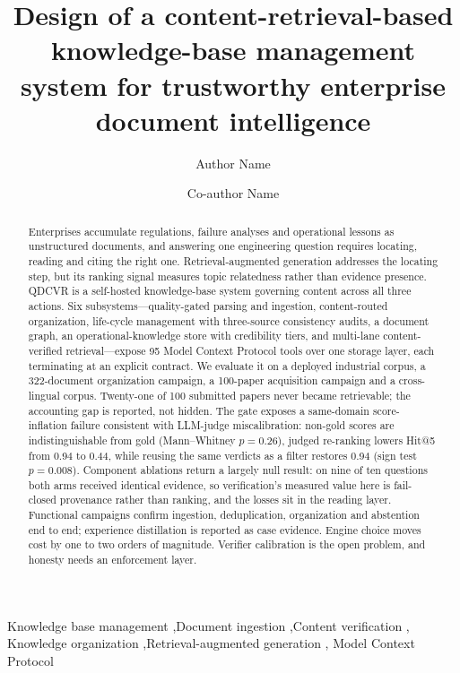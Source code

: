 \documentclass[preprint,12pt]{elsarticle}
\begin{document}
\begin{frontmatter}

\title{Design of a content-retrieval-based knowledge-base management system
for trustworthy enterprise document intelligence}

\author[inst1]{Author Name}
\author[inst1]{Co-author Name}

\begin{abstract}
Enterprises accumulate regulations, failure analyses and operational lessons
as unstructured documents, and answering one engineering question requires
locating, reading and citing the right one. Retrieval-augmented generation
addresses the locating step, but its ranking signal measures topic relatedness
rather than evidence presence. QDCVR is a self-hosted
knowledge-base system governing content across all three
actions. Six subsystems---quality-gated parsing and ingestion, content-routed
organization, life-cycle management with three-source consistency audits, a
document graph, an operational-knowledge store with credibility tiers, and
multi-lane content-verified retrieval---expose 95 Model Context Protocol tools
over one storage layer, each terminating at an explicit contract. We evaluate it on a deployed industrial corpus, a
322-document organization campaign, a 100-paper acquisition campaign and a
cross-lingual corpus. Twenty-one of 100 submitted
papers never became retrievable; the accounting gap is reported, not hidden. The gate exposes a
same-domain score-inflation failure consistent with LLM-judge
miscalibration: non-gold scores are indistinguishable from gold
(Mann--Whitney $p = 0.26$), judged re-ranking lowers Hit@5 from 0.94 to 0.44,
while reusing the same verdicts as a filter restores 0.94 (sign test
$p = 0.008$). Component ablations return a largely null result: on nine of ten
questions both arms received identical evidence, so verification's measured
value here is fail-closed provenance rather than ranking, and the losses sit
in the reading layer. Functional campaigns confirm ingestion,
deduplication, organization and abstention end to end; experience distillation
is reported as case evidence. Engine
choice moves cost by one to two orders of magnitude. Verifier calibration is
the open problem, and honesty needs an enforcement layer.
\end{abstract}

\begin{keyword}
Knowledge base management \sep Document ingestion \sep Content verification \sep
Knowledge organization \sep Retrieval-augmented generation \sep
Model Context Protocol
\end{keyword}

\end{frontmatter}
\end{document}
